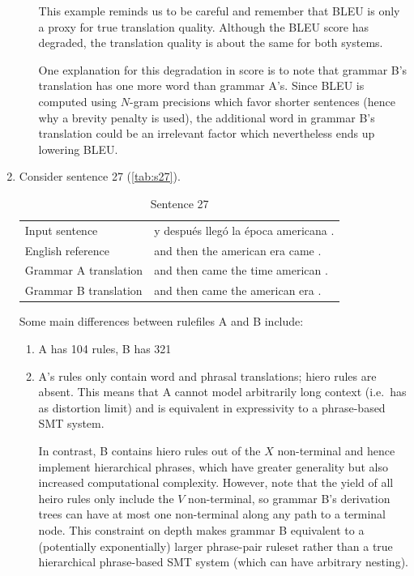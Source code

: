 \documentclass[a4paper,oneside,reqno]{amsart}
\begin{document}
\begin{enumerate}[label=\arabic*.]
\begin{enumerate}[label=(\alph*)]
        This example reminds us to be careful and remember that BLEU is only a
        proxy for true translation quality. Although the BLEU score has degraded,
        the translation quality is about the same for both systems.

        One explanation for this degradation in score is to note that grammar B's
        translation has one more word than grammar A's. Since BLEU is computed using
        $N$-gram precisions which favor shorter sentences (hence why a brevity penalty
        is used), the additional word in grammar B's translation could be an irrelevant
        factor which nevertheless ends up lowering BLEU.
    \end{enumerate}

  \item
    Consider sentence 27 (\autoref{tab:s27}).
    \begin{table}[H]
      \begin{tabular}{p{5cm}p{10cm}}
        Input sentence & y después llegó la época americana .  \\
            English reference & and then the american era came .  \\
            Grammar A translation & and then came the time american .  \\
            Grammar B translation & and then came the american era .  \\
      \end{tabular}
          \caption{Sentence 27}
          \label{tab:s27}
    \end{table}
    Some main differences between rulefiles A and B include:
    \begin{enumerate}
      \item A has 104 rules, B has 321
      \item A's rules only contain word and phrasal translations; hiero rules
        are absent.  This means that A cannot model arbitrarily long context
        (i.e.\ has as distortion limit) and is equivalent in expressivity to a
        phrase-based SMT system.

        In contrast, B contains hiero rules out of the $X$ non-terminal and
        hence implement hierarchical phrases, which have greater generality but
        also increased computational complexity. However, note that the yield
        of all heiro rules only include the $V$ non-terminal, so grammar B's
        derivation trees can have at most one non-terminal along any path to a
        terminal node. This constraint on depth makes grammar B equivalent to a
        (potentially exponentially) larger phrase-pair ruleset rather than a
        true hierarchical phrase-based SMT system (which can have arbitrary
        nesting).
    \end{enumerate}


\end{enumerate}
\end{document}
